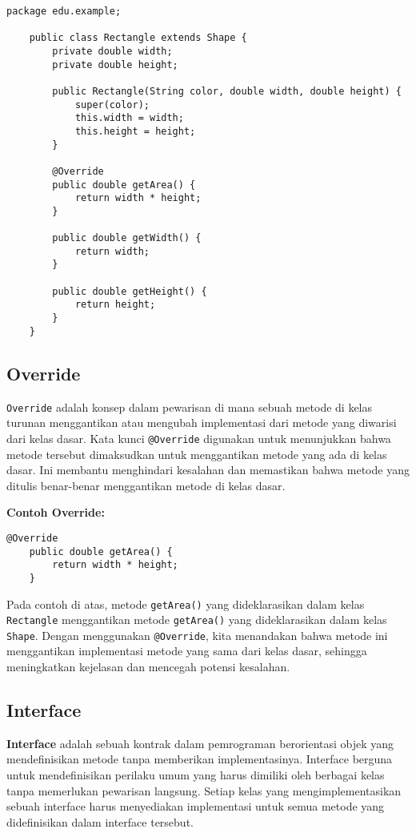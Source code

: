 \begin{lstlisting}[style=JavaStyle]
	package edu.example;
	
	public class Rectangle extends Shape {
		private double width;
		private double height;
		
		public Rectangle(String color, double width, double height) {
			super(color);
			this.width = width;
			this.height = height;
		}
		
		@Override
		public double getArea() {
			return width * height;
		}
		
		public double getWidth() {
			return width;
		}
		
		public double getHeight() {
			return height;
		}
	}
\end{lstlisting}

\subsection{Override}

\texttt{Override} adalah konsep dalam pewarisan di mana sebuah metode di kelas turunan menggantikan atau mengubah implementasi dari metode yang diwarisi dari kelas dasar. Kata kunci \texttt{@Override} digunakan untuk menunjukkan bahwa metode tersebut dimaksudkan untuk menggantikan metode yang ada di kelas dasar. Ini membantu menghindari kesalahan dan memastikan bahwa metode yang ditulis benar-benar menggantikan metode di kelas dasar.

\textbf{Contoh Override:}

\begin{lstlisting}[style=JavaStyle]
	@Override
	public double getArea() {
		return width * height;
	}
\end{lstlisting}

Pada contoh di atas, metode \texttt{getArea()} yang dideklarasikan dalam kelas \texttt{Rectangle} menggantikan metode \texttt{getArea()} yang dideklarasikan dalam kelas \texttt{Shape}. Dengan menggunakan \texttt{@Override}, kita menandakan bahwa metode ini menggantikan implementasi metode yang sama dari kelas dasar, sehingga meningkatkan kejelasan dan mencegah potensi kesalahan.

\subsection{Interface}

\textbf{Interface} adalah sebuah kontrak dalam pemrograman berorientasi objek yang mendefinisikan metode tanpa memberikan implementasinya. Interface berguna untuk mendefinisikan perilaku umum yang harus dimiliki oleh berbagai kelas tanpa memerlukan pewarisan langsung. Setiap kelas yang mengimplementasikan sebuah interface harus menyediakan implementasi untuk semua metode yang didefinisikan dalam interface tersebut.

